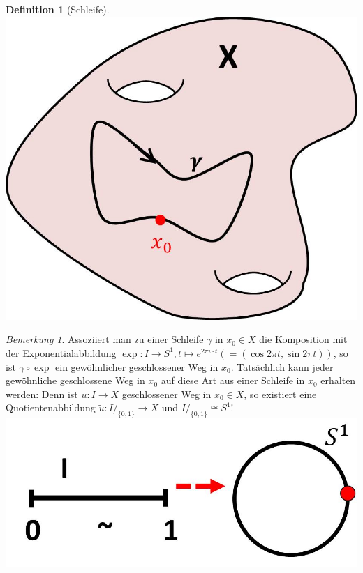 \documentclass[a4paper,11pt,notitlepage]{report}
\theoremstyle{remark}
\newtheorem{remark}{Bemerkung}[chapter]
\theoremstyle{definition}
\newtheorem{definition}{Definition}[chapter]
\begin{document}
\begin{definition}[Schleife]
	 \newline \includegraphics[scale=0.3]{images/Schleife.jpg}
\end{definition}

\begin{remark}{}
	Assoziiert man zu einer Schleife $\gamma$ in $x_0 \in X$ die Komposition mit der Exponentialabbildung $\exp \colon I \rightarrow S^1, t \mapsto e^{2 \pi i \cdot t} (= (\cos 2 \pi t, \sin 2 \pi t))$, so ist $\gamma \circ \exp$ ein gewöhnlicher geschlossener Weg in $x_0$.
	\newline
	Tatsächlich kann jeder gewöhnliche geschlossene Weg in $x_0$ auf diese Art aus einer Schleife in $x_0$ erhalten werden:
	\newline
	Denn ist $u \colon I \rightarrow X$ geschlossener Weg in $x_0 \in X$, so existiert eine Quotientenabbildung $\tilde{u}\colon I/_{\{0,1\}} \rightarrow X$ und $I/_{\{0,1\}} \cong S^1!$\newline
	\includegraphics[scale=0.3]{images/I_S1.jpg}
\end{remark}
\end{document}
